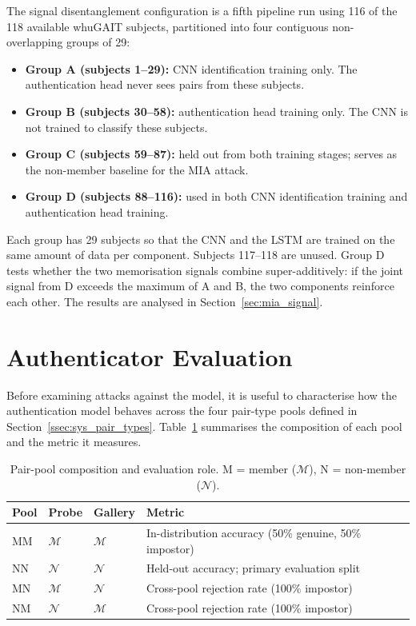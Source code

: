 The signal disentanglement configuration is a fifth pipeline run using 116 of the 118 available whuGAIT subjects, partitioned into four contiguous non-overlapping groups of 29:

\begin{itemize}
  \item \textbf{Group A (subjects 1--29):} CNN identification training only.
    The authentication head never sees pairs from these subjects.
  \item \textbf{Group B (subjects 30--58):} authentication head training only.
    The CNN is not trained to classify these subjects.
  \item \textbf{Group C (subjects 59--87):} held out from both training stages;
    serves as the non-member baseline for the MIA attack.
  \item \textbf{Group D (subjects 88--116):} used in both CNN identification
    training and authentication head training.
\end{itemize}

Each group has 29 subjects so that the CNN and the LSTM are trained on the same amount of data per component. Subjects 117--118 are unused. Group D tests whether the two memorisation signals combine super-additively: if the joint signal from D exceeds the maximum of A and B, the two components reinforce each other. The results are analysed in Section~\ref{sec:mia_signal}.

\section{Authenticator Evaluation}
\label{sec:auth_eval}

Before examining attacks against the model, it is useful to characterise how the authentication model behaves across the four pair-type pools defined in Section~\ref{ssec:sys_pair_types}. Table~\ref{tab:pool_description} summarises the composition of each pool and the metric it measures.

\begin{table}[htbp]
\centering
\caption{Pair-pool composition and evaluation role. M = member ($\mathcal{M}$), N = non-member ($\mathcal{N}$).}
\label{tab:pool_description}
\begin{tabular}{llll}
\toprule
Pool & Probe & Gallery & Metric \\
\midrule
MM & $\mathcal{M}$ & $\mathcal{M}$ & In-distribution accuracy (50\% genuine, 50\% impostor) \\
NN & $\mathcal{N}$ & $\mathcal{N}$ & Held-out accuracy; primary evaluation split \\
MN & $\mathcal{M}$ & $\mathcal{N}$ & Cross-pool rejection rate (100\% impostor) \\
NM & $\mathcal{N}$ & $\mathcal{M}$ & Cross-pool rejection rate (100\% impostor) \\
\bottomrule
\end{tabular}
\end{table}

